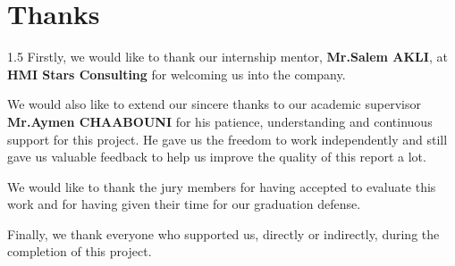 \chapter*{Thanks}
\begin{spacing}{1.5}
Firstly, we would like to thank our internship mentor, \textbf{Mr.Salem AKLI}, at \textbf{HMI Stars Consulting} for welcoming us into the company.

We would also like to extend our sincere thanks to our academic supervisor \textbf{Mr.Aymen CHAABOUNI} for his patience, understanding and continuous support for this project. He gave us the freedom to work independently and still gave us valuable feedback to help us improve the quality of this report a lot.

We would like to thank the jury members for having accepted to evaluate this work and for having given their time for our graduation defense.

Finally, we thank everyone who supported us, directly or indirectly, during the completion of this project.

\end{spacing}
